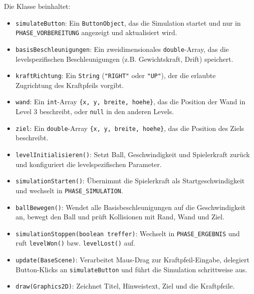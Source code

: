 Die Klasse beinhaltet:
\begin{sloppypar}
    \begin{itemize}
        \item \texttt{simulateButton}: Ein \texttt{ButtonObject}, das die Simulation startet und nur in \texttt{PHASE\_VORBEREITUNG} angezeigt und aktualisiert wird.
        \item \texttt{basisBeschleunigungen}: Ein zweidimensionales \texttt{double}-Array, das die levelspezifischen Beschleunigungen (z.B. Gewichtskraft, Drift) speichert.
        \item \texttt{kraftRichtung}: Ein \texttt{String} (\texttt{"RIGHT"} oder \texttt{"UP"}), der die erlaubte Zugrichtung des Kraftpfeils vorgibt.
        \item \texttt{wand}: Ein \texttt{int}-Array \texttt{\{x, y, breite, hoehe\}}, das die Position der Wand in Level 3 beschreibt, oder \texttt{null} in den anderen Levels.
        \item \texttt{ziel}: Ein \texttt{double}-Array \texttt{\{x, y, breite, hoehe\}}, das die Position des Ziels beschreibt.
        \item \texttt{levelInitialisieren()}: Setzt Ball, Geschwindigkeit und Spielerkraft zurück und konfiguriert die levelspezifischen Parameter.
        \item \texttt{simulationStarten()}: Übernimmt die Spielerkraft als Startgeschwindigkeit und wechselt in \texttt{PHASE\_SIMULATION}.
        \item \texttt{ballBewegen()}: Wendet alle Basisbeschleunigungen auf die Geschwindigkeit an, bewegt den Ball und prüft Kollisionen mit Rand, Wand und Ziel.
        \item \texttt{simulationStoppen(boolean treffer)}: Wechselt in \texttt{PHASE\_ERGEBNIS} und ruft \texttt{levelWon()} bzw. \texttt{levelLost()} auf.
        \item \texttt{update(BaseScene)}: Verarbeitet Maus-Drag zur Kraftpfeil-Eingabe, delegiert Button-Klicks an \texttt{simulateButton} und führt die Simulation schrittweise aus.
        \item \texttt{draw(Graphics2D)}: Zeichnet Titel, Hinweistext, Ziel und die Kraftpfeile.
    \end{itemize}
\end{sloppypar}

